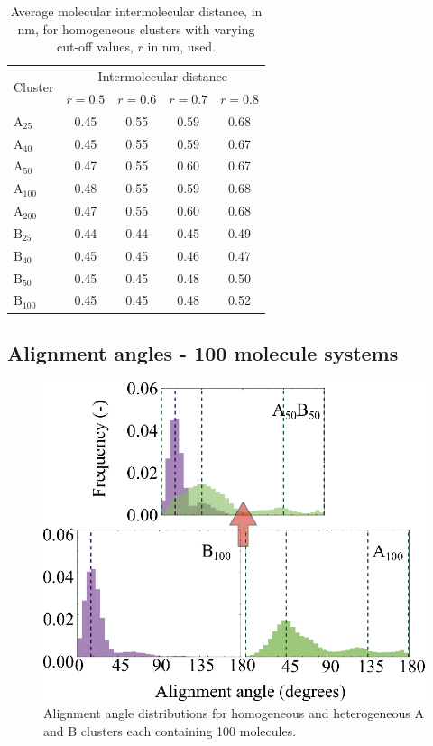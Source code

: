 % 
\begin{table}[]
\centering
\caption{Average molecular intermolecular distance, in nm, for homogeneous clusters with varying cut-off values, $r$ in nm, used.}
\label{tableSI:intermolecdistscutoff}
\begin{tabular}{lcccc}
\hline
\multicolumn{1}{l}{\multirow{2}{*}{Cluster}} & \multicolumn{4}{c}{\multirow{1}{*}{Intermolecular distance}} \\
 & $r = 0.5$ & $r = 0.6$ & $r = 0.7$ & $r = 0.8$ \\ \hline
$\text{A}_{\text{25}}$ & 0.45 & 0.55 & 0.59 & 0.68 \\
$\text{A}_{\text{40}}$ & 0.45 & 0.55 & 0.59 & 0.67 \\
$\text{A}_{\text{50}}$ & 0.47 & 0.55 & 0.60 & 0.67 \\
$\text{A}_{\text{100}}$ & 0.48 & 0.55 & 0.59 & 0.68 \\
$\text{A}_{\text{200}}$ & 0.47 & 0.55 & 0.60 & 0.68 \\ \hline
$\text{B}_{\text{25}}$ & 0.44 & 0.44 & 0.45 & 0.49 \\
$\text{B}_{\text{40}}$ & 0.45 & 0.45 & 0.46 & 0.47 \\
$\text{B}_{\text{50}}$ & 0.45 & 0.45 & 0.48 & 0.50 \\ 
$\text{B}_{\text{100}}$ & 0.45 & 0.45 & 0.48 & 0.52 \\ \hline
\end{tabular}
\end{table}
%





\subsection{Alignment angles - 100 molecule systems}
%
\begin{figure}[!tbh]
\centering
\includegraphics[width=0.5\linewidth]{Figures/alignment_angles_heteroSI.eps}
\caption{Alignment angle distributions for homogeneous and heterogeneous A and B clusters each containing 100 molecules.}
\label{figSI:alignmentangles_100}
\end{figure}
%

